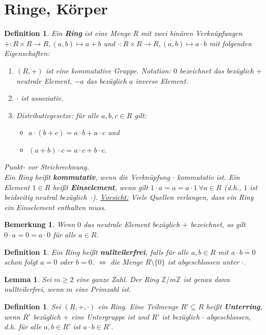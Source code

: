 \documentclass[12pt,a4paper]{article}
\theoremstyle{plain}
\newtheorem{Lemma}[Theorem]{Lemma}
\newtheorem{Definition}[Theorem]{Definition}
\newtheorem{Bemerkung}[Theorem]{Bemerkung}
\newcommand{\herv}[1]{{\emph{\textbf{#1}}}}
\newcommand{\Z}{\mathbb{Z}}
\numberwithin{equation}{section}
\begin{document}
\section{Ringe, Körper}
\begin{Definition}
Ein \herv{Ring} ist eine Menge R mit zwei binären Verknüpfungen $+:R\times R\rightarrow R, (a,b)\mapsto a+b$ und $\cdot :R\times R\rightarrow R, (a,b)\mapsto a\cdot b$ mit folgenden Eigenschaften:
\begin{enumerate}
\renewcommand{\labelenumi}{\emph{\underline{R\arabic{enumi}}}}
\item $(R,+)$ ist eine kommutative Gruppe. Notation: $0$ bezeichnet das bezüglich $+$ neutrale Element, $-a$ das bezüglich $a$ inverse Element.
\item $\cdot$ ist assoziativ.
\item Distributivgesetze: für alle $a,b,c\in R$ gilt:
\begin{itemize}
\item $a\cdot(b+c)=a\cdot b+ a\cdot c$ und
\item $(a+b)\cdot c= a\cdot c + b\cdot c$.
\end{itemize}
\end{enumerate}
\glqq Punkt- vor Strichrechnung\grqq. \\
Ein Ring heißt \herv{kommutativ}, wenn die Verknüpfung $\cdot$ kommutativ ist. Ein Element $1\in R$ heißt \herv{Einselement}, wenn gilt $1\cdot a=a=a\cdot 1\ \forall a\in R$ (d.h., $1$ ist beidseitig neutral \mbox{bezüglich $\cdot$).} \underline{Vorsicht:} Viele Quellen verlangen, dass ein Ring ein Einselement enthalten muss. 
\end{Definition}
\begin{Bemerkung}
Wenn $0$ das neutrale Element bezüglich $+$ bezeichnet, so gilt $0\cdot a=0=a\cdot 0$ für alle $a\in R$.
\end{Bemerkung}
\begin{Definition}
Ein Ring heißt \herv{nullteilerfrei}, falls für alle $a,b\in R$ mit $a\cdot b=0$ schon folgt $a=0$ oder $b=0$. $\Leftrightarrow$ die Menge $R\setminus\{0\}$ ist abgeschlossen unter $\cdot$.
\end{Definition}
\begin{Lemma}
Sei $m\geq 2$ eine ganze Zahl. Der Ring $\Z/m\Z$ ist genau dann nullteilerfrei, wenn $m$ eine Primzahl ist.
\end{Lemma}
\begin{Definition}
Sei $(R,+,\cdot)$ ein Ring. Eine Teilmenge $R'\subseteq R$ heißt \herv{Unterring}, wenn $R'$ bezüglich $+$ eine Untergruppe ist und $R'$ ist bezüglich $\cdot$ abgeschlossen, d.h. für alle $a,b\in R'$ ist $a\cdot b\in R'$.
\end{Definition}
\end{document}
